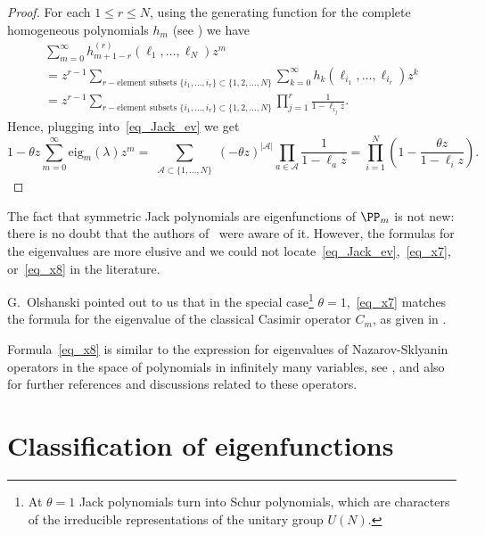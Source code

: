 \begin{proof}
 For each $1\le r\le N$, using the generating function for the complete homogeneous polynomials $h_m$ (see \cite[Chapter 1, Section 2]{macdonald1998symmetric}) we have
\begin{multline*}
 \sum_{m=0}^{\infty} h^{(r)}_{m+1-r}(\ell_1,\dots,\ell_N) z^m
 \\= z^{r-1} \sum_{r-\text{element subsets }\{i_1,\dots,i_r\}\subset\{1,2,\dots,N\}}\sum_{k=0}^{\infty} h_k(\ell_{i_1},\dots,\ell_{i_r}) z^k
 \\= z^{r-1} \sum_{r-\text{element subsets }\{i_1,\dots,i_r\}\subset\{1,2,\dots,N\}} \prod_{j=1}^r \frac{1}{1-\ell_{i_j}z}.
\end{multline*}
Hence, plugging into~\eqref{eq_Jack_ev} we get
$$
  1-\theta z \sum_{m=0}^{\infty}  \mathrm{eig}_m(\lambda) z^m=
  \sum_{\begin{smallmatrix} \mathcal A\subset \{1,\dots,N\} \end{smallmatrix}}  (-\theta z)^{|\mathcal A|}
   \prod_{a\in \mathcal A} \frac{1}{1-\ell_{a}z}=\prod_{i=1}^N\left(1-\frac{\theta z}{1-\ell_i z}\right).
$$
\end{proof}

\begin{rema}
 The fact that symmetric Jack polynomials are eigenfunctions of $\PP_m$ is not new: there is no doubt that the authors of~\cite{heckman1991elementary,polychronakos1992exchange,lapointe1996exact} were aware of it. However, the formulas for the eigenvalues are more elusive and we could not locate~\eqref{eq_Jack_ev},~\eqref{eq_x7}, or~\eqref{eq_x8} in the literature.

 G.~Olshanski pointed out to us that in the special case\footnote{At $\theta=1$ Jack polynomials turn into Schur polynomials, which are characters of the irreducible representations of the unitary group $U(N)$.} $\theta=1$,~\eqref{eq_x7} matches the formula for the eigenvalue of the classical Casimir operator $C_m$, as given in \cite[(*) and Theorem 2 in Section 60]{zhelobenko1973compact}.

  Formula~\eqref{eq_x8} is similar to the expression for eigenvalues of Nazarov-Sklyanin operators in the space of polynomials in infinitely many variables, see \cite[Section 6]{nazarov2013integrable}, and also~\cite{mickler2023spectral} for further references and discussions related to these operators.
\end{rema}

\section{Classification of eigenfunctions}

